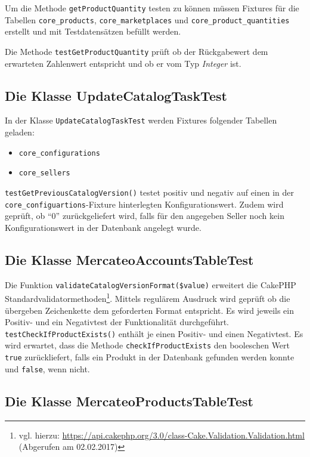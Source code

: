 {	Um die Methode \texttt{getProductQuantity} testen zu können müssen Fixtures für die Tabellen \texttt{core\_products}, \texttt{core\_marketplaces} und \texttt{core\_product\_quantities} erstellt und mit Testdatensätzen befüllt werden.

	Die Methode \texttt{testGetProductQuantity} prüft ob der Rückgabewert dem erwarteten Zahlenwert entspricht und ob er vom Typ \textit{Integer} ist.
	
	\subsection{Die Klasse UpdateCatalogTaskTest}
	
	In der Klasse \texttt{UpdateCatalogTaskTest} werden Fixtures folgender Tabellen geladen:
	\begin{itemize}[nosep]
		\item \texttt{core\_configurations}
		\item \texttt{core\_sellers}

		
	\end{itemize}
	
	\texttt{testGetPreviousCatalogVersion()} testet positiv und negativ auf einen in der \texttt{core\_configuartions}-Fixture hinterlegten Konfigurationswert. Zudem wird geprüft, ob \enquote{0} zurückgeliefert wird, falls für den angegeben Seller noch kein Konfigurationswert in der Datenbank angelegt wurde.
	
	

	
	\subsection{Die Klasse MercateoAccountsTableTest}
	
	Die Funktion \texttt{validateCatalogVersionFormat(\$value)} erweitert die CakePHP Standardvalidatormethoden\footnote{vgl. hierzu: \url{https://api.cakephp.org/3.0/class-Cake.Validation.Validation.html} (Abgerufen am 02.02.2017) }. Mittels regulärem Ausdruck wird geprüft ob die übergeben Zeichenkette dem  geforderten Format entspricht. Es wird jeweils ein Positiv- und ein Negativtest der Funktionalität durchgeführt. 
	\texttt{testCheckIfProductExists()} enthält je einen Positiv- und einen Negativtest. Es wird erwartet, dass die Methode \texttt{checkIfProductExists} den booleschen Wert \texttt{true} zurückliefert, falls ein Produkt in der Datenbank gefunden werden konnte und \texttt{false}, wenn nicht.
	
	\subsection{Die Klasse MercateoProductsTableTest}
	
}

